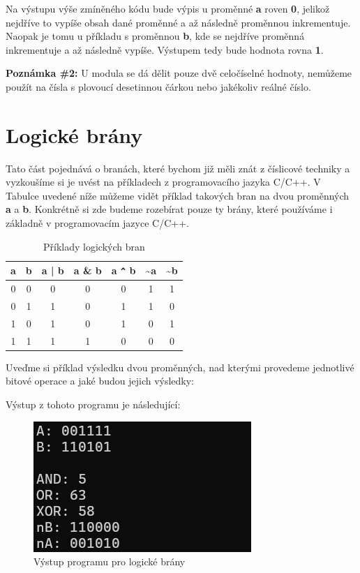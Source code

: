 \documentclass[twoside,a4paper]{article} %
\begin{document}


Na výstupu výše zmíněného kódu bude výpis u proměnné \textbf{a} roven \textbf{0}, jelikož nejdříve to vypíše obsah dané proměnné a až následně proměnnou inkrementuje. Naopak je tomu u příkladu s proměnnou \textbf{b}, kde se nejdříve proměnná inkrementuje a až následně vypíše. Výstupem tedy bude hodnota rovna \textbf{1}.

\textbf{Poznámka \#2:} U modula se dá dělit pouze dvě celočíselné hodnoty, nemůžeme použít na čísla s plovoucí desetinnou čárkou nebo jakékoliv reálné číslo.

\section{Logické brány}
Tato část pojednává o branách, které bychom již měli znát z číslicové techniky a vyzkoušíme si je uvést na příkladech z programovacího jazyka C/C++. V Tabulce uvedené níže můžeme vidět příklad takových bran na dvou proměnných \textbf{a} a \textbf{b}. Konkrétně si zde budeme rozebírat pouze ty brány, které používáme i základně v programovacím jazyce C/C++.


\begin{table}[H]
    \centering
    \begin{tabular}{|c|c||c|c|c|c|c|}
      \rowcolor{yellow}\hline  a & b & a | b & a \& b & a \texttt{\^{}} b & \textasciitilde a & \textasciitilde b\\
        \hline 0 & 0 & 0 &  0& 0 &  1&1 \\
         \hline 0 & 1 & 1 &  0& 1 & 1 &0 \\
         \hline 1&  0&  1&  0&  1& 0 & 1\\
         \hline 1&  1&  1& 1 &  0& 0 & 0\\ \hline
    \end{tabular}
    \caption{Příklady logických bran}
    \label{tab:logicGates}
\end{table}

Uveďme si příklad výsledku dvou proměnných, nad kterými provedeme jednotlivé bitové operace a jaké budou jejich výsledky:



Výstup z tohoto programu je následující:

\begin{figure}[H]
    \centering
    \includegraphics[width=0.4\linewidth]{images/logicGatesOutput.png}
    \caption{Výstup programu pro logické brány}
    \label{fig:placeholder}
\end{figure}
\end{document}
